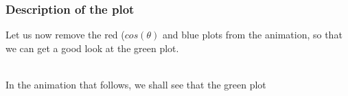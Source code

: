 \begin{frame}[t]

	\frametitle{Description of the plot}

	Let us now remove the red (\(cos(\theta)\) and blue plots from the animation, so that we can get a good look at the green plot.\\~

	In the animation that follows, we shall see that the green plot

\end{frame}
